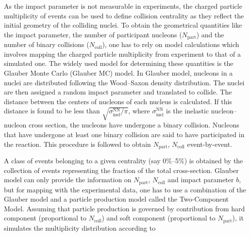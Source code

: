 As the impact parameter is not measurable in experiments, the charged particle multiplicity of events can be used to define collision centrality as they reflect the initial geometry of the colliding nuclei. To obtain the geometrical quantities like the impact parameter, the number of participant nucleons (\(N_\mathrm{part}\)) and the number of binary collisions (\(N_\mathrm{coll}\)), one has to rely on model calculations which involves mapping the charged particle multiplicity from experiment to that of a simulated one. The widely used model for determining these quantities is the Glauber Monte Carlo (Glauber MC) model. In Glauber model, nucleons in a nuclei are distributed following the Wood–Saxon density distribution. The nuclei are then assigned a random impact parameter and translated to collide. The distance between the centers of nucleons of each nucleus is calculated. If this distance is found to be less than \(\sqrt{\sigma_\mathrm{inel}^\mathrm{NN}/\pi}\), where \(\sigma_\mathrm{inel}^\mathrm{NN}\) is the inelastic nucleon–nucleon cross section, the nucleons have undergone a binary collision. Nucleons that have undergone at least one binary collision are said to have participated in the reaction. This procedure is followed to obtain \(N_\mathrm{part}\), \(N_\mathrm{coll}\) event-by-event.

A class of events belonging to a given centrality (say 0\%–5\%) is obtained by the collection of events representing the fraction of the total cross-section. Glauber model can only provide the information on \(N_\mathrm{part}\), \(N_\mathrm{coll}\) and impact parameter \(b\), but for mapping with the experimental data, one has to use a combination of the Glauber model and a particle production model called the Two-Component Model. Assuming that particle production is governed by contribution from hard component (proportional to \(N_\mathrm{coll}\)) and soft component (proportional to  \(N_\mathrm{part}\)), it simulates the multiplicity distribution according to


